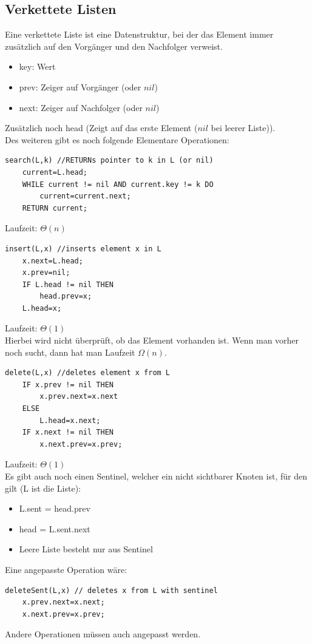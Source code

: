 \documentclass{article}
\begin{document}
        \subsection{Verkettete Listen}
            Eine verkettete Liste ist eine Datenstruktur, bei der das Element immer zusätzlich auf den Vorgänger und den Nachfolger verweist.
            \begin{itemize}
                \item key: Wert
                \item prev: Zeiger auf Vorgänger (oder $nil$)
                \item next: Zeiger auf Nachfolger (oder $nil$)
            \end{itemize}
            Zusätzlich noch head (Zeigt auf das erste Element ($nil$ bei leerer Liste)).\\
            Des weiteren gibt es noch folgende Elementare Operationen:
            \begin{lstlisting}[style=pseudocode]
search(L,k) //RETURNs pointer to k in L (or nil)
    current=L.head;
    WHILE current != nil AND current.key != k DO
        current=current.next;
    RETURN current;
            \end{lstlisting}
            Laufzeit: $\Theta(n)$
            \begin{lstlisting}[style=pseudocode]
insert(L,x) //inserts element x in L
    x.next=L.head;
    x.prev=nil;
    IF L.head != nil THEN
        head.prev=x;
    L.head=x;
            \end{lstlisting}
            Laufzeit: $\Theta(1)$\\
            Hierbei wird nicht überprüft, ob das Element vorhanden ist. Wenn man vorher noch sucht, dann hat man Laufzeit $\Omega(n)$.
            \begin{lstlisting}[style=pseudocode]
delete(L,x) //deletes element x from L
    IF x.prev != nil THEN
        x.prev.next=x.next
    ELSE
        L.head=x.next;
    IF x.next != nil THEN
        x.next.prev=x.prev;
            \end{lstlisting}
            Laufzeit: $\Theta(1)$\\
            Es gibt auch noch einen Sentinel, welcher ein nicht sichtbarer Knoten ist, für den gilt (L ist die Liste):
            \begin{itemize}
                \item L.sent = head.prev
                \item head = L.sent.next
                \item Leere Liste besteht nur aus Sentinel
            \end{itemize}
            Eine angepasste Operation wäre:
            \begin{lstlisting}[style=pseudocode]
deleteSent(L,x) // deletes x from L with sentinel
    x.prev.next=x.next;
    x.next.prev=x.prev;
            \end{lstlisting}
            Andere Operationen müssen auch angepasst werden.
\end{document}
